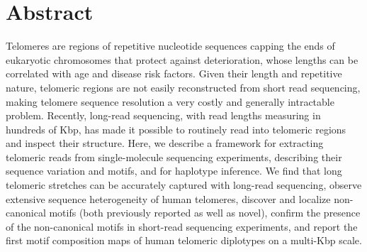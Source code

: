 \documentclass{article}
\begin{document}
\section*{Abstract} 
Telomeres are regions of repetitive nucleotide sequences capping the ends of eukaryotic chromosomes that protect against deterioration, whose lengths can be correlated with age and disease risk factors.
Given their length and repetitive nature, telomeric regions are not easily reconstructed from short read sequencing, making telomere sequence resolution a very costly and generally intractable problem.
Recently, long-read sequencing, with read lengths measuring in hundreds of Kbp, has made it possible to routinely read into telomeric regions and inspect their structure.
Here, we describe a framework for extracting telomeric reads from single-molecule sequencing experiments, describing their sequence variation and motifs, and for haplotype inference.
We find that
long telomeric stretches can be accurately captured with long-read sequencing,
observe extensive sequence heterogeneity of human telomeres,
discover and localize non-canonical motifs (both previously reported as well as novel),
confirm the presence of the non-canonical motifs in short-read sequencing experiments,
and report the first motif composition maps of human telomeric diplotypes on a multi-Kbp scale.

\pagebreak
\doublespacing
\end{document}
